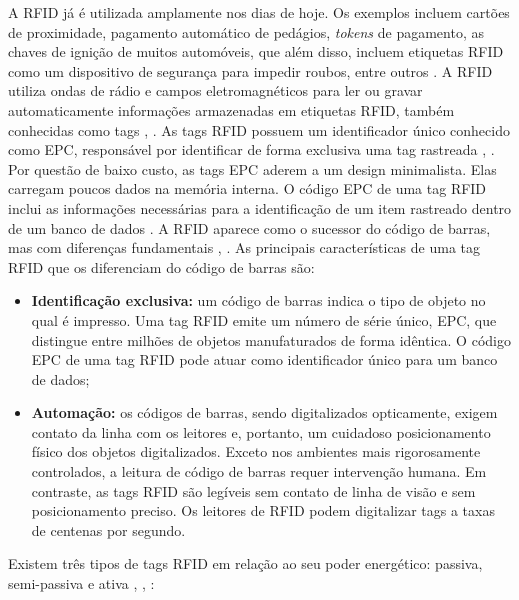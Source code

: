 A \acrshort{RFID} já é utilizada amplamente nos dias de hoje. Os exemplos incluem cartões de proximidade, pagamento automático de pedágios, \textit{tokens} de pagamento, as chaves de ignição de muitos automóveis, que além disso, incluem etiquetas \acrshort{RFID} como um dispositivo de segurança para impedir roubos, entre outros \cite{Juels2006RFIDSurvey}. A \acrshort{RFID} utiliza ondas de rádio e campos eletromagnéticos para ler ou gravar automaticamente informações armazenadas em etiquetas \acrshort{RFID}, também conhecidas como tags \cite{Bolic2010}, \cite{Juels2006RFIDSurvey}. As tags \acrshort{RFID} possuem um identificador único conhecido como \acrshort{EPC}, responsável por identificar de forma exclusiva uma tag rastreada \cite{Huiting2016}, \cite{Casula2016}. Por questão de baixo custo, as tags \acrshort{EPC} aderem a um design minimalista. Elas carregam poucos dados na memória interna. O código \acrshort{EPC} de uma tag \acrshort{RFID} inclui as informações necessárias para a identificação de um item rastreado dentro de um banco de dados \cite{Juels2006RFIDSurvey}. A \acrshort{RFID} aparece como o sucessor do código de barras, mas com diferenças fundamentais \cite{Bolic2010}, \cite{Juels2006RFIDSurvey}. As principais características de uma tag \acrshort{RFID} que os diferenciam do código de barras são:

\begin{itemize}
    \item \textbf{Identificação exclusiva:} um código de barras indica o tipo de objeto no qual é impresso. Uma tag \acrshort{RFID} emite um número de série único, \acrshort{EPC}, que distingue entre milhões de objetos manufaturados de forma idêntica. O código \acrshort{EPC} de uma tag \acrshort{RFID} pode atuar como identificador único para um banco de dados;
    \item \textbf{Automação:} os códigos de barras, sendo digitalizados opticamente, exigem contato da linha com os leitores e, portanto, um cuidadoso posicionamento físico dos objetos digitalizados. Exceto nos ambientes mais rigorosamente controlados, a leitura de código de barras requer intervenção humana. Em contraste, as tags \acrshort{RFID} são legíveis sem contato de linha de visão e sem posicionamento preciso. Os leitores de \acrshort{RFID} podem digitalizar tags a taxas de centenas por segundo.
\end{itemize}

Existem três tipos de tags \acrshort{RFID} em relação ao seu poder energético: passiva, semi-passiva e ativa \cite{Bolic2010}, \cite{Juels2006RFIDSurvey}, \cite{Li2016}:

